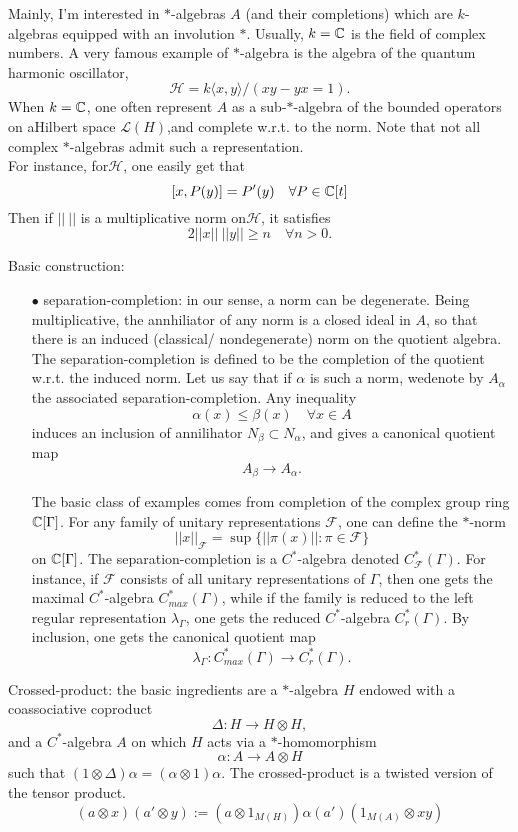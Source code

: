 Mainly, I'm interested in $*$-algebras $A$ (and their completions) which are $k$-algebras equipped with an involution $*$. Usually, $k=\mathbb C$ is the field of complex numbers. A very famous example of $*$-algebra is the algebra of the quantum harmonic oscillator,
\[\mathcal H = k\langle x, y\rangle / (xy -yx = 1).\]
When $k=\mathbb C$, one often represent $A$ as a sub-$*$-algebra of the bounded operators on aHilbert space $\mathcal L(H)$,and complete w.r.t. to the norm. Note that not all complex $*$-algebras admit such a representation. \\

For instance, for$\mathcal H$, one easily get that 
\[[x,P(y)] = P'(y) \quad \forall P\in \mathbb C[t]\]
Then if $||\ ||$ is a multiplicative norm on$\mathcal H$, it satisfies
\[ 2 ||x|| \ ||y|| \geq n \quad \forall n>0.\]   

Basic construction:
\begin{itemize}
\item[$\bullet$] separation-completion: in our sense, a norm can be degenerate. Being multiplicative, the annhiliator of any norm is a closed ideal in $A$, so that there is an induced (classical/ nondegenerate) norm on the quotient algebra. The separation-completion is defined to be the completion of the quotient w.r.t. the induced norm. Let us say that if $\alpha$ is such a norm, wedenote by $A_\alpha$ the associated separation-completion. Any inequality 
\[\alpha(x) \leq \beta (x) \quad \forall x\in A\]
induces an inclusion of annilihator $N_\beta \subset N_\alpha$, and gives a canonical quotient map
\[A_\beta \rightarrow A_\alpha.\]

The basic class of examples comes from completion of the complex group ring $\mathbb C[\Gamma]$. For any family of unitary representations $\mathcal F$, one can define the $*$-norm
\[||x||_{\mathcal F} = \sup \{||\pi(x)|| : \pi\in \mathcal F\}\]
on $\mathbb C[\Gamma]$. The separation-completion is a $C^*$-algebra denoted $C^*_{\mathcal F}(\Gamma)$. For instance, if $\mathcal F$ consists of all unitary representations of $\Gamma$, then one gets the maximal $C^*$-algebra $C_{max}^*(\Gamma)$, while if the family is reduced to the left regular representation $\lambda_\Gamma$, one gets the reduced $C^*$-algebra $C^*_r(\Gamma)$. By inclusion, one gets the canonical quotient map
\[\lambda_\Gamma : C^*_{max}(\Gamma) \rightarrow C_r^*(\Gamma).\]  
 
\end{itemize}

Crossed-product: the basic ingredients are a $*$-algebra $H$ endowed with a coassociative coproduct
\[\Delta : H \rightarrow H\otimes H,\]
and a $C^*$-algebra $A$ on which $H$ acts via a $*$-homomorphism
\[\alpha : A \rightarrow A\otimes H\]
such that $(1\otimes \Delta)\alpha = (\alpha \otimes 1) \alpha$. The crossed-product is a twisted version of the tensor product.  
\[(a\otimes x )(a'\otimes y ) := (a\otimes 1_{M(H)}) \alpha (a')(1_{M(A)}\otimes xy)\]
 
